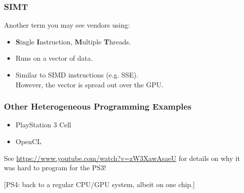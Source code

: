 \begin{frame}
  \frametitle{SIMT}



  Another term you may see vendors using:

  \begin{itemize}
    \item {\bf S}ingle {\bf I}nstruction, {\bf M}ultiple {\bf T}hreads.
    \item Runs on a vector of data.
    \item Similar to SIMD instructions (e.g. SSE).\\
     However, the vector is spread out over the GPU.
  \end{itemize}

\end{frame}

\begin{frame}
  \frametitle{Other Heterogeneous Programming Examples}


\begin{itemize}
\item PlayStation 3 Cell\\
\item OpenCL
\end{itemize}


See \url{https://www.youtube.com/watch?v=zW3XawAsaeU} for details on why it was hard to program for the PS3!

[PS4: back to a regular CPU/GPU system, albeit on one chip.]


\end{frame}

